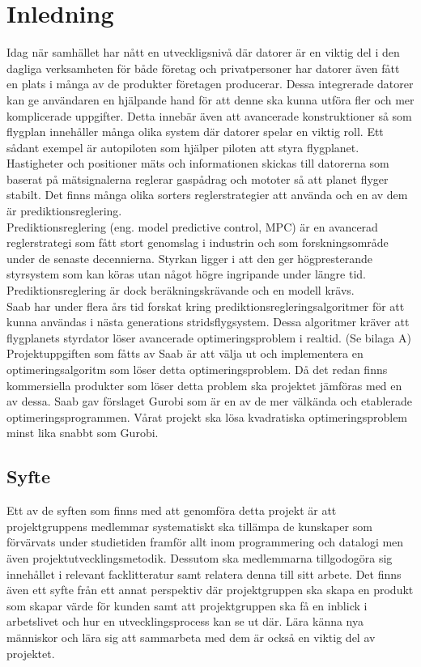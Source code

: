 \section{Inledning}
Idag när samhället har nått en utveckligsnivå där datorer är en viktig del i den dagliga verksamheten för både företag och privatpersoner har datorer även fått en plats i många av de produkter företagen producerar. Dessa integrerade datorer kan ge användaren en hjälpande hand för att denne ska kunna utföra fler och mer komplicerade uppgifter. Detta innebär även att avancerade konstruktioner så som flygplan innehåller många olika system där datorer spelar en viktig roll. Ett sådant exempel är autopiloten som hjälper piloten att styra flygplanet. Hastigheter och positioner mäts och informationen skickas till datorerna som baserat på mätsignalerna reglerar gaspådrag och mototer så att planet flyger stabilt. Det finns många olika sorters reglerstrategier att använda och en av dem är prediktionsreglering. 
\\ 
Prediktionsreglering (eng. model predictive control, MPC) är en avancerad reglerstrategi som fått stort genomslag i industrin och som forskningsområde under de senaste decennierna. Styrkan ligger i att den ger högpresterande styrsystem som kan köras utan något högre ingripande under längre tid. Prediktionsreglering är dock beräkningskrävande och en modell krävs. \citep[2]{ir}
\\
Saab har under flera års tid forskat kring prediktionsregleringsalgoritmer för att kunna användas i nästa generations stridsflygsystem. Dessa algoritmer kräver att flygplanets styrdator löser avancerade optimeringsproblem i realtid. (Se bilaga A)
\\ 
Projektuppgiften som fåtts av Saab är att välja ut och implementera en optimeringsalgoritm som löser detta optimeringsproblem. Då det redan finns kommersiella produkter som löser detta problem ska projektet jämföras med en av dessa. Saab gav förslaget Gurobi som är en av de mer välkända och etablerade optimeringsprogrammen. Vårat projekt ska lösa kvadratiska optimeringsproblem minst lika snabbt som Gurobi.     

\subsection{Syfte}
Ett av de syften som finns med att genomföra detta projekt är att projektgruppens medlemmar systematiskt ska tillämpa de kunskaper som förvärvats under studietiden framför allt inom programmering och datalogi men även projektutvecklingsmetodik. Dessutom ska medlemmarna tillgodogöra sig innehållet i relevant facklitteratur samt relatera denna till sitt arbete. 
Det finns även ett syfte från ett annat perspektiv där projektgruppen ska skapa en produkt som skapar värde för kunden samt att projektgruppen ska få en inblick i arbetslivet och hur en utvecklingsprocess kan se ut där. Lära känna nya människor och lära sig att sammarbeta med dem är också en viktig del av projektet. 

